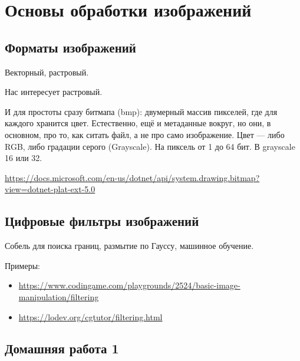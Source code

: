 \section{Основы обработки изображений}

\subsection{Форматы изображений}

Векторный, растровый.

Нас интересует растровый.

И для простоты сразу битмапа (bmp): двумерный массив пикселей, где для каждого хранится цвет.
Естественно, ещё и метаданные вокруг, но они, в основном, про то, как ситать файл, а не про само изображение.
Цвет --- либо RGB, либо градации серого (Grayscale). На пиксель от 1 до 64 бит. В grayscale 16 или 32.

\href{Bitmap in .NET}{https://docs.microsoft.com/en-us/dotnet/api/system.drawing.bitmap?view=dotnet-plat-ext-5.0}

\subsection{Цифровые фильтры изображений}

Собель для поиска границ, размытие по Гауссу, машинное обучение.

Примеры: 
\begin{itemize}
\item \url{https://www.codingame.com/playgrounds/2524/basic-image-manipulation/filtering}
\item \url{https://lodev.org/cgtutor/filtering.html}
\end{itemize}

\subsection{Домашняя работа 1}

